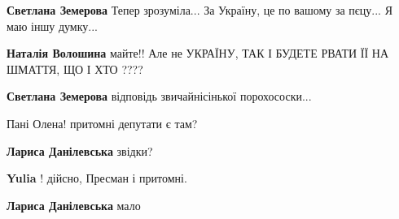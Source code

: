 \begin{itemize}
\begin{itemize}
\textbf{Светлана Земерова} Тепер зрозуміла... За Україну, це по вашому за пєцу... Я маю іншу думку...

 
\textbf{Наталія Волошина} майте!! Але не УКРАЇНУ, ТАК І БУДЕТЕ РВАТИ ЇЇ НА ШМАТТЯ, ЩО І ХТО ????🤣🤣🤣🤣

 
\textbf{Светлана Земерова} відповідь звичайнісінької порохососки...
\end{itemize}

 
Пані Олена! притомні депутати є там?

\begin{itemize}
 
\textbf{Лариса Данілевська} звідки?

 
\textbf{Yulia} ! дійсно, Пресман і притомні.

 
\textbf{Лариса Данілевська} мало
\end{itemize}


\end{itemize}
